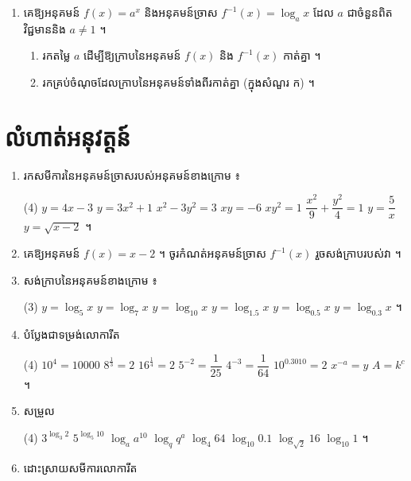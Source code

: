 \begin{enumerate}[1]
  \item គេឱ្យអនុគមន៍ $f(x) = a^x$ និងអនុគមន៍ច្រាស $f^{-1}(x) = \log_a x$ ដែល $a$ ជាចំនួនពិតវិជ្ជមាននិង $a \ne 1$ ។
  \begin{enumerate}[a]
    \item រកតម្លៃ $a$ ដើម្បីឱ្យក្រាបនៃអនុគមន៍ $f(x)$ និង $f^{-1}(x)$ កាត់គ្នា ។
    \item រកគ្រប់ចំណុចដែលក្រាបនៃអនុគមន៍ទាំងពីរកាត់គ្នា (ក្នុងសំណួរ ក) ។
  \end{enumerate}
\end{enumerate}

\section*{លំហាត់អនុវត្តន៍}
\begin{enumerate}[1]
  \item រកសមីការនៃអនុគមន៍ច្រាសរបស់អនុគមន៍ខាងក្រោម ៖
  \begin{tasks}(4)
    \task $y = 4x - 3$
    \task $y = 3x^2 + 1$
    \task $x^2 - 3y^2 = 3$
    \task $xy = -6$
    \task $xy^2 = 1$
    \task $\dfrac{x^2}{9} + \dfrac{y^2}{4} = 1$
    \task $y = \dfrac{5}{x}$
    \task $y = \sqrt{x - 2}$ ។
  \end{tasks}
  \item គេឱ្យអនុគមន៍ $f(x) = x - 2$ ។ ចូរកំណត់អនុគមន៍ច្រាស $f^{-1}(x)$ រួចសង់ក្រាបរបស់វា ។
  \item សង់ក្រាបនៃអនុគមន៍ខាងក្រោម ៖
  \begin{tasks}(3)
    \task $y = \log_5 x$
    \task $y = \log_7 x$
    \task $y = \log_{10} x$
    \task $y = \log_{1.5} x$
    \task $y = \log_{0.5} x$
    \task $y = \log_{0.3} x$ ។
  \end{tasks}
  \item បំប្លែងជាទម្រង់លោការីត
  \begin{tasks}(4)
    \task $10^4 = 10000$
    \task $8^{\frac{1}{3}} = 2$
    \task $16^{\frac{1}{4}} = 2$
    \task $5^{-2} = \dfrac{1}{25}$
    \task $4^{-3} = \dfrac{1}{64}$
    \task $10^{0.3010} = 2$
    \task $x^{-a} = y$
    \task $A = k^c$ ។
  \end{tasks}
  \item សម្រួល
  \begin{tasks}(4)
    \task $3^{\log_3 2}$
    \task $5^{\log_5 10}$
    \task $\log_a a^{10}$
    \task $\log_q q^a$
    \task $\log_4 64$
    \task $\log_{10} 0.1$
    \task $\log_{\sqrt{2}} 16$
    \task $\log_{10} 1$ ។
  \end{tasks}
  \item ដោះស្រាយសមីការលោការីត

\end{enumerate}

